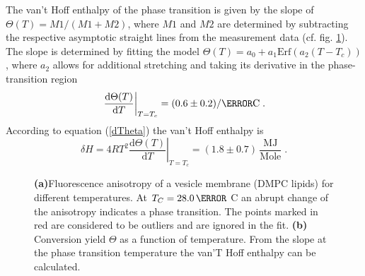 \documentclass{scrartcl}
\numberwithin{equation}{section}
\numberwithin{figure}{section}
\numberwithin{table}{section}
\newcommand{\eq}[2]{\begin{equation}#1\label{#2}\end{equation}}
\newcommand{\Formel}[1]{(\ref{#1})}
\begin{document}
The van't Hoff enthalpy of the phase transition is given by the slope of $\Theta(T)=M1/(M1+M2)$, where $M1$ and $M2$ are determined by subtracting the respective asymptotic straight lines from the measurement data (cf. fig. \ref{fig:phase}). The slope is determined by fitting the model $\Theta(T)=a_0+a_1 \text{Erf}\left(a_2(T-T_c)\right)$, where $a_2$ allows for additional stretching and taking its derivative in the phase-transition region
\eq{\left. \frac{\mathrm d \Theta (T) }{\mathrm d T}\right|_{T=T_c} = (0.6 \pm 0.2) / \degree \text{C} \; .}{}
According to equation \Formel{dTheta} the van't Hoff enthalpy is
\eq{\delta H = 4 R T^2 \left. \frac{ \mathrm d \Theta (T) } {\mathrm d T}\right|_{T=T_c} = (1.8 \pm 0.7) \, \frac{ \text{MJ} }{ \text{Mole} } \; .}{}



\begin{figure}
\centering
{}

\caption{ \small \textbf{(a)}Fluorescence anisotropy of a vesicle membrane (DMPC lipids) for different temperatures. At $T_C=28.0 \, \degree$ C an abrupt change of the anisotropy indicates a phase transition. The points marked in red are considered to be outliers and are ignored in the fit. \textbf{(b)} Conversion yield $\Theta$ as a function of temperature. From the slope at the phase transition temperature the van'T Hoff enthalpy can be calculated.}
\label{fig:phase}
\end{figure}
\end{document}
